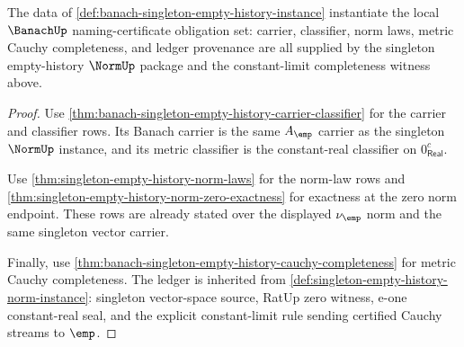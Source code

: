 \begin{theorem}
\label{thm:banach-singleton-empty-history-namecert-obligations}
The data of \autoref{def:banach-singleton-empty-history-instance} instantiate
the local $\BanachUp$ naming-certificate obligation set: carrier,
classifier, norm laws, metric Cauchy completeness, and ledger provenance are
all supplied by the singleton empty-history $\NormUp$ package and the
constant-limit completeness witness above.
\end{theorem}
\begin{proof}
Use \autoref{thm:banach-singleton-empty-history-carrier-classifier} for the
carrier and classifier rows. Its Banach carrier is the same $A_{\emp}$ carrier
as the singleton $\NormUp$ instance, and its metric classifier is the
constant-real classifier on $0_{\mathsf{Real}}^{c}$.

Use \autoref{thm:singleton-empty-history-norm-laws} for the norm-law rows and
\autoref{thm:singleton-empty-history-norm-zero-exactness} for exactness at the
zero norm endpoint. These rows are already stated over the displayed
$\nu_{\emp}$ norm and the same singleton vector carrier.

Finally, use
\autoref{thm:banach-singleton-empty-history-cauchy-completeness} for metric
Cauchy completeness. The ledger is inherited from
\autoref{def:singleton-empty-history-norm-instance}: singleton vector-space
source, RatUp zero witness, e-one constant-real seal, and the explicit
constant-limit rule sending certified Cauchy streams to $\emp$.
\end{proof}

